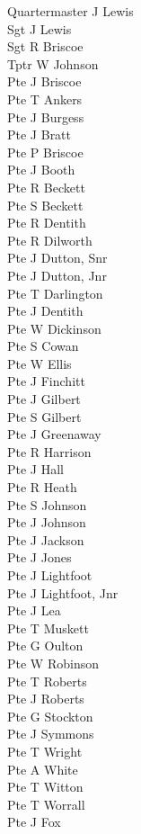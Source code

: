 \begin{multicols}{2}
  \noindent
  Quartermaster J Lewis \\
  Sgt J Lewis \\
  Sgt R Briscoe \\
  Tptr W Johnson \\
  Pte J Briscoe \\
  Pte T Ankers \\
  Pte J Burgess \\
  Pte J Bratt \\
  Pte P Briscoe \\
  Pte J Booth \\
  Pte R Beckett \\
  Pte S Beckett \\
  Pte R Dentith \\
  Pte R Dilworth \\
  Pte J Dutton, Snr \\
  Pte J Dutton, Jnr \\
  Pte T Darlington \\
  Pte J Dentith \\
  Pte W Dickinson \\
  Pte S Cowan \\
  Pte W Ellis \\
  Pte J Finchitt \\
  Pte J Gilbert \\
  Pte S Gilbert \\
  Pte J Greenaway \\
  Pte R Harrison \\
  Pte J Hall \\
  Pte R Heath \\
  Pte S Johnson \\
  Pte J Johnson \\
  Pte J Jackson \\
  Pte J Jones \\
  Pte J Lightfoot \\
  Pte J Lightfoot, Jnr \\
  Pte J Lea \\
  Pte T Muskett \\
  Pte G Oulton \\
  Pte W Robinson \\
  Pte T Roberts \\
  Pte J Roberts \\
  Pte G Stockton \\
  Pte J Symmons \\
  Pte T Wright \\
  Pte A White \\
  Pte T Witton \\
  Pte T Worrall \\
  Pte J Fox \\
\end{multicols}

